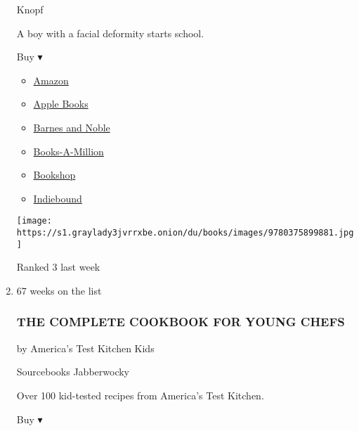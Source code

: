 \begin{enumerate}
  Knopf

  A boy with a facial deformity starts school.

  Buy ▾

  \begin{itemize}
  \tightlist
  \item
    \href{http://www.amazon.com/Wonder-R-J-Palacio-ebook/dp/B0051ANPZQ?tag=NYTBS-20}{Amazon}
  \item
    \href{https://du-gae-books-dot-nyt-du-prd.appspot.com/buy?title=WONDER\&author=RJ+Palacio}{Apple
    Books}
  \item
    \href{https://www.anrdoezrs.net/click-7990613-11819508?url=https\%3A\%2F\%2Fwww.barnesandnoble.com\%2Fw\%2F\%3Fean\%3D9780375869020}{Barnes
    and Noble}
  \item
    \href{https://www.anrdoezrs.net/click-7990613-35140?url=https\%3A\%2F\%2Fwww.booksamillion.com\%2Fp\%2FWONDER\%2FRJ\%2BPalacio\%2F9780375869020}{Books-A-Million}
  \item
    \href{https://bookshop.org/a/3546/9780375869020}{Bookshop}
  \item
    \href{https://www.indiebound.org/book/9780375869020?aff=NYT}{Indiebound}
  \end{itemize}

  \texttt{[image: https://s1.graylady3jvrrxbe.onion/du/books/images/9780375899881.jpg]}

  Ranked 3 last week
\item
  67 weeks on the list

  \hypertarget{the-complete-cookbook-for-young-chefs}{%
  \subsubsection{THE COMPLETE COOKBOOK FOR YOUNG
  CHEFS}\label{the-complete-cookbook-for-young-chefs}}

  by America's Test Kitchen Kids

  Sourcebooks Jabberwocky

  Over 100 kid-tested recipes from America's Test Kitchen.

  Buy ▾


\end{enumerate}
